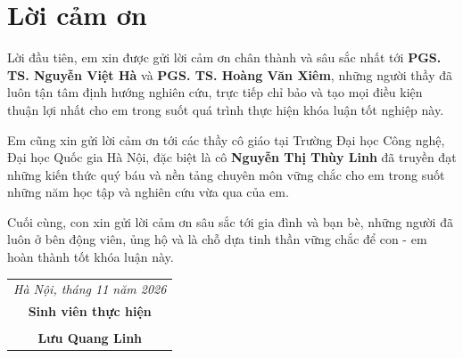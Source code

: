 \chapter*{Lời cảm ơn}
\thispagestyle{empty}

Lời đầu tiên, em xin được gửi lời cảm ơn chân thành và sâu sắc nhất tới \textbf{PGS. TS. Nguyễn Việt Hà} và \textbf{PGS. TS. Hoàng Văn Xiêm}, những người thầy đã luôn tận tâm định hướng nghiên cứu, trực tiếp chỉ bảo và tạo mọi điều kiện thuận lợi nhất cho em trong suốt quá trình thực hiện khóa luận tốt nghiệp này.

Em cũng xin gửi lời cảm ơn tới các thầy cô giáo tại Trường Đại học Công nghệ, Đại học Quốc gia Hà Nội, đặc biệt là cô \textbf{Nguyễn Thị Thùy Linh} đã truyền đạt những kiến thức quý báu và nền tảng chuyên môn vững chắc cho em trong suốt những năm học tập và nghiên cứu vừa qua của em.

Cuối cùng, con xin gửi lời cảm ơn sâu sắc tới gia đình và bạn bè, những người đã luôn ở bên động viên, ủng hộ và là chỗ dựa tinh thần vững chắc để con - em hoàn thành tốt khóa luận này.

\vspace{1.5cm}
\begin{flushright}
\begin{tabular}{c}
\textit{Hà Nội, tháng 11 năm 2026} \\
\textbf{Sinh viên thực hiện} \\
\vspace{2cm} \\
\textbf{Lưu Quang Linh}
\end{tabular}
\end{flushright}
